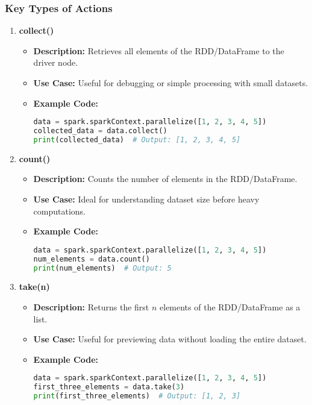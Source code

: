 \documentclass{beamer}
\begin{document}
\begin{frame}
    \frametitle{Key Types of Actions}
    \begin{enumerate}
        \item \textbf{collect()} \\
            \begin{itemize}
                \item \textbf{Description:} Retrieves all elements of the RDD/DataFrame to the driver node.
                \item \textbf{Use Case:} Useful for debugging or simple processing with small datasets.
                \item \textbf{Example Code:}
                \begin{lstlisting}[language=Python]
data = spark.sparkContext.parallelize([1, 2, 3, 4, 5])
collected_data = data.collect()
print(collected_data)  # Output: [1, 2, 3, 4, 5]
                \end{lstlisting}
            \end{itemize}
        
        \item \textbf{count()} \\
            \begin{itemize}
                \item \textbf{Description:} Counts the number of elements in the RDD/DataFrame.
                \item \textbf{Use Case:} Ideal for understanding dataset size before heavy computations.
                \item \textbf{Example Code:}
                \begin{lstlisting}[language=Python]
data = spark.sparkContext.parallelize([1, 2, 3, 4, 5])
num_elements = data.count()
print(num_elements)  # Output: 5
                \end{lstlisting}
            \end{itemize}
        
        \item \textbf{take(n)} \\
            \begin{itemize}
                \item \textbf{Description:} Returns the first \( n \) elements of the RDD/DataFrame as a list.
                \item \textbf{Use Case:} Useful for previewing data without loading the entire dataset.
                \item \textbf{Example Code:}
                \begin{lstlisting}[language=Python]
data = spark.sparkContext.parallelize([1, 2, 3, 4, 5])
first_three_elements = data.take(3)
print(first_three_elements)  # Output: [1, 2, 3]
                \end{lstlisting}
            \end{itemize}
    \end{enumerate}
\end{frame}
\end{document}
